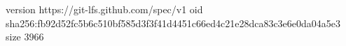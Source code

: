 version https://git-lfs.github.com/spec/v1
oid sha256:fb92d52fc5b6c510bf585d3f3f41d4451c66ed4c21e28dca83c3e6e0da04a5e3
size 3966
